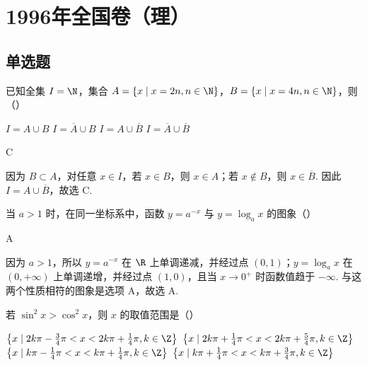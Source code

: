 \documentclass[UTF8,a4paper,oneside,11pt]{ctexbook}
\begin{document}
\mainmatter

\chapter{1996年全国卷（理）}
\section{单选题}

\begin{problem}
已知全集 \(I = \N\)，集合 \(A = \{x \mid x = 2n, n \in \N\}\)，\(B = \{x \mid x = 4n, n \in \N\}\)，则（\quad）

\choices
    {\(I = A\cup B\)}
    {\(I = \overline{A}\cup B\)}
    {\(I = A\cup \overline{B}\)}
    {\(I = \overline{A}\cup \overline{B}\)}
\end{problem}

\begin{answer}
C
\end{answer}

\begin{solution}
因为 \(B\subset A\)，对任意 \(x\in I\)，若 \(x\in B\)，则 \(x\in A\)；若 \(x\notin B\)，则 \(x\in\overline B\). 因此 \(I=A\cup\overline B\)，故选 C.
\end{solution}

\begin{problem}
当 \(a > 1\) 时，在同一坐标系中，函数 \(y = a^{-x}\) 与 \(y = \log_a x\) 的图象（\quad）

\choices
    {}
    {}
    {}
    {}
\end{problem}

\begin{answer}
A
\end{answer}

\begin{solution}
因为 \(a>1\)，所以 \(y=a^{-x}\) 在 \(\R\) 上单调递减，并经过点 \((0,1)\)；\(y=\log_a x\) 在 \((0,+\infty)\) 上单调递增，并经过点 \((1,0)\)，且当 \(x\to0^+\) 时函数值趋于 \(-\infty\). 与这两个性质相符的图象是选项 A，故选 A.
\end{solution}

\begin{problem}
若 \(\sin^2 x > \cos^2 x\)，则 \(x\) 的取值范围是（\quad）

\choices
    {\(\left\{x\mid 2k\pi -\frac{3}{4}\pi < x < 2k\pi +\frac{1}{4}\pi ,k\in \Z\right\}\)}
    {\(\left\{x\mid 2k\pi +\frac{1}{4}\pi < x < 2k\pi +\frac{5}{4}\pi ,k\in \Z\right\}\)}
    {\(\left\{x\mid k\pi -\frac{1}{4}\pi < x < k\pi + \frac{1}{4}\pi ,k\in \Z\right\}\)}
    {\(\left\{x\mid k\pi +\frac{1}{4}\pi < x < k\pi + \frac{3}{4}\pi ,k\in \Z\right\}\)}
\end{problem}
\end{document}
